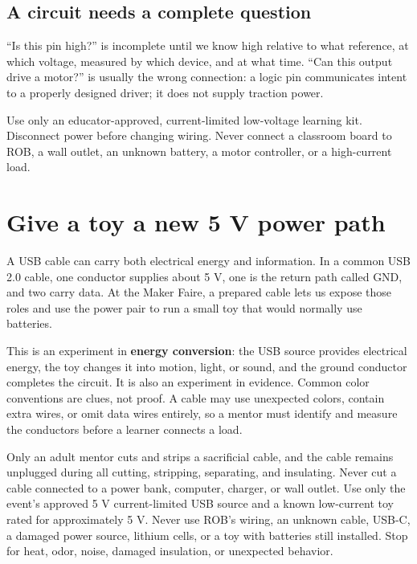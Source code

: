 \section*{A circuit needs a complete question}

``Is this pin high?'' is incomplete until we know high relative to what reference, at which voltage, measured by which device, and at what time. ``Can this output drive a motor?'' is usually the wrong connection: a logic pin communicates intent to a properly designed driver; it does not supply traction power.

\begin{safetybox}
Use only an educator-approved, current-limited low-voltage learning kit. Disconnect power before changing wiring. Never connect a classroom board to ROB, a wall outlet, an unknown battery, a motor controller, or a high-current load.
\end{safetybox}

\clearpage
\chapter{Give a toy a new 5 V power path}

A USB cable can carry both electrical energy and information. In a common USB 2.0 cable, one conductor supplies about 5 V, one is the return path called GND, and two carry data. At the Maker Faire, a prepared cable lets us expose those roles and use the power pair to run a small toy that would normally use batteries.

This is an experiment in \textbf{energy conversion}: the USB source provides electrical energy, the toy changes it into motion, light, or sound, and the ground conductor completes the circuit. It is also an experiment in evidence. Common color conventions are clues, not proof. A cable may use unexpected colors, contain extra wires, or omit data wires entirely, so a mentor must identify and measure the conductors before a learner connects a load.

\begin{safetybox}[title={UNPLUG, PREPARE, VERIFY, THEN ENERGIZE}]
Only an adult mentor cuts and strips a sacrificial cable, and the cable remains unplugged during all cutting, stripping, separating, and insulating. Never cut a cable connected to a power bank, computer, charger, or wall outlet. Use only the event's approved 5 V current-limited USB source and a known low-current toy rated for approximately 5 V. Never use ROB's wiring, an unknown cable, USB-C, a damaged power source, lithium cells, or a toy with batteries still installed. Stop for heat, odor, noise, damaged insulation, or unexpected behavior.
\end{safetybox}

